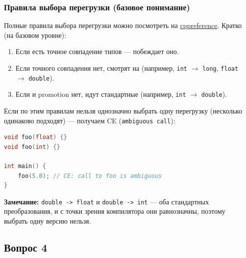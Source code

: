 \subsubsection{Правила выбора перегрузки (базовое понимание)}
Полные правила выбора перегрузки можно посмотреть на \href{https://en.cppreference.com/w/cpp/language/overload_resolution}{cppreference}. Кратко (на базовом уровне):
\begin{enumerate}
  \item Если есть точное совпадение типов --- побеждает оно.
  \item Если точного совпадения нет, смотрят на  (например, \texttt{int} $\to$ \texttt{long}, \texttt{float} $\to$ \texttt{double}).
  \item Если и promotion нет, идут стандартные  (например, \texttt{int} $\to$ \texttt{double}).
\end{enumerate}
Если по этим правилам нельзя однозначно выбрать одну перегрузку (несколько одинаково подходят) --- получаем CE (\texttt{ambiguous call}):
\begin{lstlisting}[language=C++]
void foo(float) {}
void foo(int) {}

int main() {
    foo(5.0); // CE: call to foo is ambiguous
}
\end{lstlisting}
\textbf{Замечание:} \texttt{double -> float} и \texttt{double -> int} --- оба стандартных преобразования, и с точки зрения компилятора они равнозначны, поэтому выбрать одну версию нельзя.
\newpage
\subsection{Вопрос 4}
